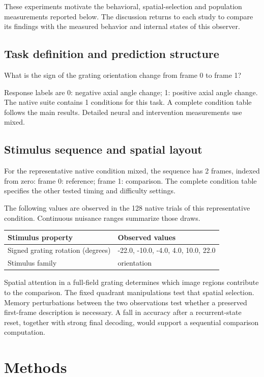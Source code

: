\documentclass[11pt]{article}
\begin{document}
These experiments motivate the behavioral, spatial-selection and population measurements reported below. The discussion returns to each study to compare its findings with the measured behavior and internal states of this observer.
\subsection{Task definition and prediction structure}
What is the sign of the grating orientation change from frame 0 to frame 1?

Response labels are 0: negative axial angle change; 1: positive axial angle change. The native suite contains 1 conditions for this task. A complete condition table follows the main results. Detailed neural and intervention measurements use mixed.

\subsection{Stimulus sequence and spatial layout}
For the representative native condition mixed, the sequence has 2 frames, indexed from zero: frame 0: reference; frame 1: comparison. The complete condition table specifies the other tested timing and difficulty settings.

The following values are observed in the 128 native trials of this representative condition. Continuous nuisance ranges summarize those draws.
\begin{center}\small\begin{tabular}{p{}p{}}\toprule Stimulus property & Observed values\\\midrule
Signed grating rotation (degrees) & -22.0, -10.0, -4.0, 4.0, 10.0, 22.0\\
Stimulus family & orientation\\
\bottomrule\end{tabular}\normalsize\end{center}
Spatial attention in a full-field grating determines which image regions contribute to the comparison. The fixed quadrant manipulations test that spatial selection. Memory perturbations between the two observations test whether a preserved first-frame description is necessary. A fall in accuracy after a recurrent-state reset, together with strong final decoding, would support a sequential comparison computation.


\section{Methods}
\end{document}

